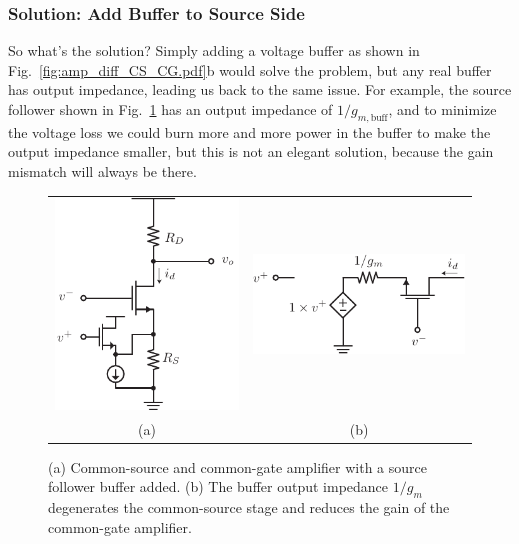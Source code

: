 \subsubsection{Solution:  Add Buffer to Source Side}
So what's the solution? Simply adding a voltage buffer as shown in Fig.~\ref{fig:amp_diff_CS_CG.pdf}b would solve the problem, but any real buffer has output impedance, leading us back to the same issue.  For example, the source follower shown in Fig.~\ref{fig:amp_diff_CS_CG_CD.pdf} has an output impedance of $1/g_{m,\text{buff}}$, and to minimize the voltage loss we could burn more and more power in the buffer to make the output impedance smaller, but this is not an elegant solution, because the gain mismatch will always be there.
\begin{figure}[tb]
\begin{center}
\begin{tabular}{cc}
\includegraphics[scale=1]{amp_diff_CS_CG_CD.pdf} &
\includegraphics[scale=1]{amp_CG_CD_Model.pdf} \\
(a) & (b) \\
\end{tabular}
\end{center}
\caption{(a) Common-source and common-gate amplifier with a source follower buffer added.  (b) The buffer output impedance $1/g_m$ degenerates the common-source stage and reduces the gain of the common-gate amplifier.}
\label{fig:amp_diff_CS_CG_CD.pdf}
\end{figure}
